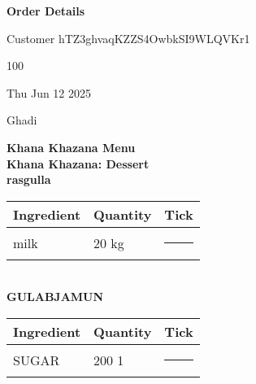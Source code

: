 \documentclass[a4paper,12pt]{article}
\newcommand{\tickbox}{\rule{2mm}{2mm}}
\begin{document}
      
      \textbf{\Large Order Details}\\[0.5cm]
      \begin{description}[leftmargin=0cm]
        \item[Customer Name:] Customer hTZ3ghvaqKZZS4OwbkSI9WLQVKr1
        \item[Number of Persons:] 100
        \item[Function Date:] Thu Jun 12 2025
        \item[Function Name:] Ghadi
      \end{description}
      \vspace{0.5cm}
      \textbf{\large Khana Khazana Menu}\\[0.3cm]
      \textbf{Khana Khazana: Dessert}\\[0.2cm]\textbf{rasgulla}\\\begin{tabular}{p{6cm} p{4cm} p{2cm}}\toprule \textbf{Ingredient} & \textbf{Quantity} & \textbf{Tick} \\ \midrule milk & 20 kg & \tickbox \\ \bottomrule\end{tabular}\\[0.3cm]\textbf{GULABJAMUN}\\\begin{tabular}{p{6cm} p{4cm} p{2cm}}\toprule \textbf{Ingredient} & \textbf{Quantity} & \textbf{Tick} \\ \midrule SUGAR & 200 1 & \tickbox \\ \bottomrule\end{tabular}\\[0.3cm]
      
      
\end{document}
